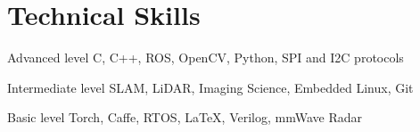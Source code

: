 \documentclass{tccv}
\begin{document}
\section{Technical Skills}
\begin{factlist}

\item{Advanced  level}
     {C, C++, ROS, OpenCV, Python, SPI and I2C protocols}

\item{Intermediate level}
     {SLAM, LiDAR, Imaging Science, Embedded Linux, Git}

\item{Basic level}
     {Torch, Caffe, RTOS, \LaTeX, Verilog, mmWave Radar}

\end{factlist}
\end{document}

